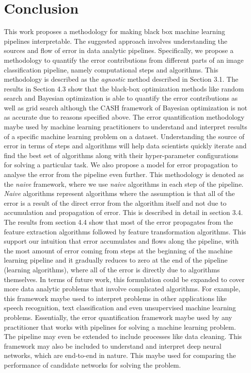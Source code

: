 \section{Conclusion}
This work proposes a methodology for making black box machine learning pipelines interpretable. The suggested approach involves understanding the sources and flow of error in data analytic pipelines. Specifically, we propose a methodology to quantify the error contributions from different parts of an image classification pipeline, namely computational steps and algorithms. This methodology is described as the \textit{agnostic} method described in Section 3.1. The results in Section 4.3 show that the black-box optimization methods like random search and Bayesian optimization is able to quantify the error contributions as well as grid search although the CASH framework of Bayesian optimization is not as accurate due to reasons specified above. The error quantification methodology maybe used by machine learning practitioners to understand and interpret results of a specific machine learning problem on a dataset. Understanding the source of error in terms of steps and algorithms will help data scientists quickly iterate and find the best set of algorithms along with their hyper-parameter configurations for solving a particular task. We also propose a model for error propagation to analyse the error from the pipeline even further. This methodology is denoted as the \textit{naive} framework, where we use \textit{naive} algorithms in each step of the pipeline. \textit{Naive} algorithms represent algorithms where the assumption is that all of the error is a result of the direct error from the algorithm itself and not due to accumulation and propagation of error. This is described in detail in section 3.4. The results from section 4.4 show that most of the error propagates from the feature extraction algorithms followed by feature transformation algorithms. This support our intuition that error accumulates and flows along the pipeline, with the most amount of error coming from steps at the beginning of the machine learning pipeline and it gradually reduces to zero at the end of the pipeline (learning algorithms), where all of the error is directly due to algorithms themselves.
In terms of future work, this formulation could be expanded to cover more data analytic problems that involve complicated algorithms. For example, this framework maybe used to interpret problems in other applications like speech recognition, text classification and even unsupervised machine learning problems. Essentially, the error quantification framework maybe used by any practitioner that works with pipelines for solving a machine learning problem. The pipeline may even be extended to include processes like data cleaning. This framework may also be included to understand and interpret deep neural networks, which are end-to-end in nature. This maybe used for comparing the performance of candidate networks for solving the problem.


\label{sec5}